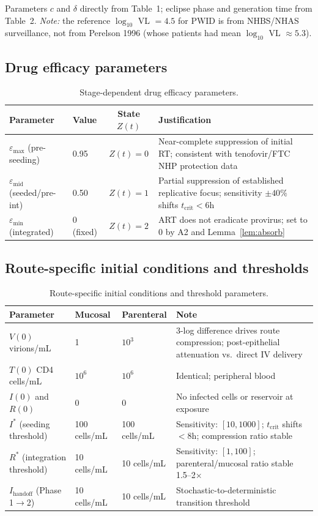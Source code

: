 \documentclass[11pt]{article}
\theoremstyle{definition}
\theoremstyle{remark}
\newcommand{\tcrit}{t_{\text{crit}}}
\newcommand{\emax}{\varepsilon_{\max}}
\newcommand{\emid}{\varepsilon_{\text{mid}}}
\newcommand{\emin}{\varepsilon_{\min}}
\begin{document}
Parameters $c$ and $\delta$ directly from Table~1; eclipse phase and generation time from Table~2. \textit{Note:} the reference $\log_{10}$ VL $= 4.5$ for PWID is from NHBS/NHAS surveillance, not from Perelson 1996 (whose patients had mean $\log_{10}$ VL $\approx 5.3$).

\subsection{Drug efficacy parameters}

\begin{table}[H]
\centering
\small
\caption{Stage-dependent drug efficacy parameters.}
\begin{tabular}{@{}llcp{6.5cm}@{}}
\toprule
\textbf{Parameter} & \textbf{Value} & \textbf{State $Z(t)$} & \textbf{Justification} \\
\midrule
$\emax$ (pre-seeding) & 0.95 & $Z(t) = 0$ & Near-complete suppression of initial RT; consistent with tenofovir/FTC NHP protection data \\
$\emid$ (seeded/pre-int) & 0.50 & $Z(t) = 1$ & Partial suppression of established replicative focus; sensitivity $\pm 40\%$ shifts $\tcrit < 6$h \\
$\emin$ (integrated) & 0 (fixed) & $Z(t) = 2$ & ART does not eradicate provirus; set to 0 by A2 and Lemma~\ref{lem:absorb} \\
\bottomrule
\end{tabular}
\end{table}

\subsection{Route-specific initial conditions and thresholds}

\begin{table}[H]
\centering
\small
\caption{Route-specific initial conditions and threshold parameters.}
\begin{tabular}{@{}lllp{6cm}@{}}
\toprule
\textbf{Parameter} & \textbf{Mucosal} & \textbf{Parenteral} & \textbf{Note} \\
\midrule
$V(0)$ virions/mL & 1 & $10^{3}$ & 3-log difference drives route compression; post-epithelial attenuation vs.\ direct IV delivery \\
$T(0)$ CD4 cells/mL & $10^{6}$ & $10^{6}$ & Identical; peripheral blood \\
$I(0)$ and $R(0)$ & 0 & 0 & No infected cells or reservoir at exposure \\
$I^{*}$ (seeding threshold) & 100 cells/mL & 100 cells/mL & Sensitivity: $[10, 1000]$; $\tcrit$ shifts $<8$h; compression ratio stable \\
$R^{*}$ (integration threshold) & 10 cells/mL & 10 cells/mL & Sensitivity: $[1, 100]$; parenteral/mucosal ratio stable 1.5--2$\times$ \\
$I_{\text{handoff}}$ (Phase 1$\to$2) & 10 cells/mL & 10 cells/mL & Stochastic-to-deterministic transition threshold \\
\bottomrule
\end{tabular}
\end{table}
\end{document}
